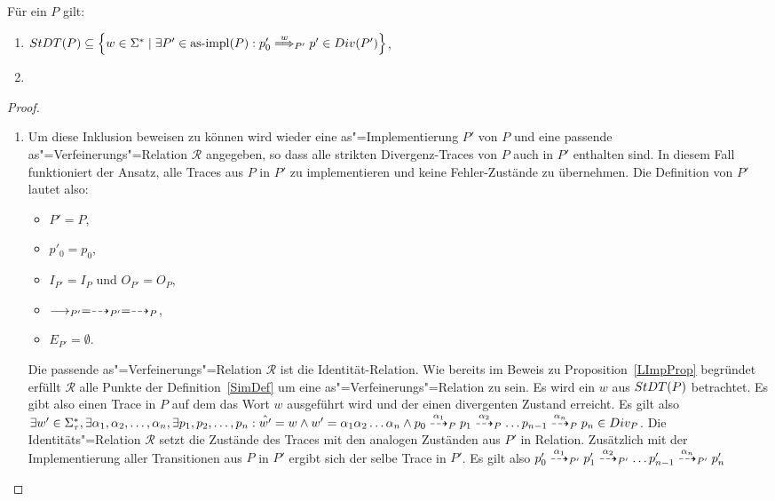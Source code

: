 \begin{Prop}
  Für ein \MEIO{} $P$ gilt:
  \begin{enumerate}
    \item $\StDT (P) \subseteq \left\{w\in\Sigma ^*\mid \exists P' \in \asimp
      (P): p'_0\weakmust[w]_{P'} p'\in Div(P')\right\}$,
    \item {}
  \end{enumerate}
\end{Prop}
\begin{proof}\mbox{}
  \begin{enumerate}
    \item 
  Um diese Inklusion beweisen zu können wird wieder eine as"=Implementierung
  $P'$ von $P$ und eine passende as"=Verfeinerungs"=Relation $\mathcal{R}$
  angegeben, so dass alle strikten Divergenz-Traces von $P$ auch in $P'$
  enthalten sind. In diesem Fall funktioniert der Ansatz, alle Traces aus $P$
  in $P'$ zu implementieren und keine Fehler-Zustände zu übernehmen. Die
  Definition von $P'$ lautet also:
  \begin{itemize}
    \item $P'=P$,
    \item $p'_0=p_0$,
    \item $I_{P'}=I_P$ und $O_{P'}=O_P$,
    \item $\must _{P'} =\may _{P'} = \may _P$,
    \item $E_{P'}=\emptyset$.
  \end{itemize}
  Die passende as"=Verfeinerungs"=Relation $\mathcal{R}$ ist die
  Identität-Relation. Wie bereits im Beweis zu Proposition~\ref{LImpProp}
  begründet erfüllt $\mathcal{R}$ alle Punkte der Definition~\ref{SimDef} um
  eine as"=Verfeinerungs"=Relation zu sein. Es wird ein $w$ aus $StDT (P)$
  betrachtet. Es gibt also einen Trace in $P$ auf dem das Wort $w$ ausgeführt
  wird und der einen divergenten Zustand erreicht. Es gilt also $\exists w' \in
  \Sigma _{\tau}^*, \exists \alpha _1, \alpha _2, \dots , \alpha _n, \exists
  p_1, p_2, \dots , p_n: \hat{w'} = w \land w' = \alpha _1\alpha _2\dots\alpha
  _n \land p_0 \may[\alpha _1]_P p_1 \may[\alpha _2]_P \dots p_{n-1}
  \may[\alpha _n]_P p_n \in Div _P$. Die Identitäts"=Relation $\mathcal{R}$
  setzt die Zustände des Traces mit den analogen Zuständen aus $P'$ in
  Relation. Zusätzlich mit der Implementierung aller Transitionen aus $P$ in
  $P'$ ergibt sich der selbe Trace in $P'$. Es gilt also $p'_0 \may[\alpha
  _1]_{P'} p'_1 \may[\alpha _2]_{P'} \dots p'_{n-1} \may[\alpha _n]_{P'} p'_n$

\end{enumerate}
\end{proof}

